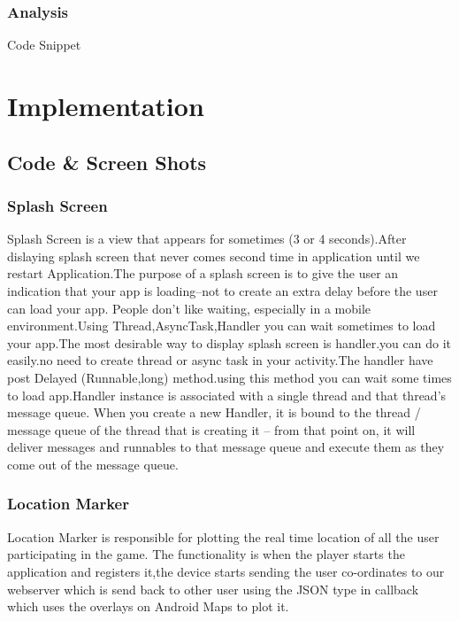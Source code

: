 \documentclass[11.4pt,a4paper,times]{report}
\begin{document}
\subsection{Analysis}
Code Snippet




\chapter{Implementation}


\section{\ignorespacesSource Code & Screen Shots}

\subsection{Splash Screen}

Splash Screen is a view that appears for sometimes (3 or 4 seconds).After dislaying splash screen that never comes second time in application until we restart Application.The purpose of a splash screen is to give the user an indication that your app is loading–not to create an extra delay before the user can load your app. People don’t like waiting, especially in a mobile environment.Using Thread,AsyncTask,Handler you can wait sometimes to load your app.The most desirable way to display splash screen is handler.you can do it easily.no need to create thread or async task in your activity.The handler have post Delayed (Runnable,long)  method.using this method you can wait some times to load app.Handler instance is associated with a single thread and that thread's message queue. When you create a new Handler, it is bound to the thread / message queue of the thread that is creating it -- from that point on, it will deliver messages and runnables to that message queue and execute them as they come out of the message queue.







%


\subsection{Location Marker}


Location Marker is responsible  for plotting the real time location of all the user participating in the game. The functionality is when the player starts the application and registers it,the device starts sending the user co-ordinates to our webserver which is send back to other user using the JSON type in callback which uses the overlays on Android Maps to plot it.
\end{document}
